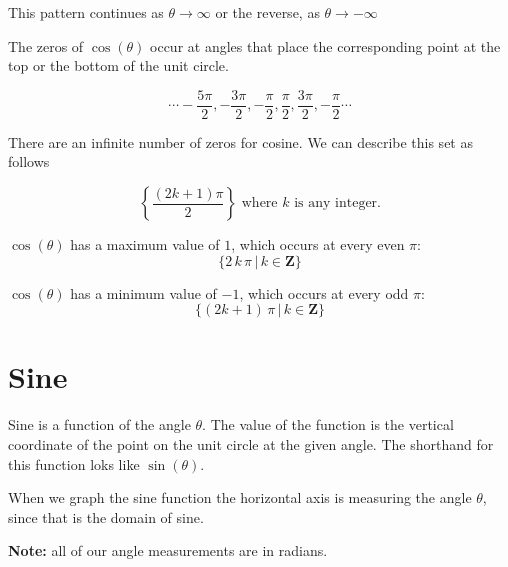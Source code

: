 \documentclass{ximera}
\begin{document}
This pattern continues as $\theta \rightarrow \infty$ or the reverse, as $\theta \rightarrow -\infty$

The zeros of $\cos(\theta)$ occur at angles that place the corresponding point at the top or the bottom of the unit circle.  


\[     \cdots -\frac{5\pi}{2},  -\frac{3\pi}{2},  -\frac{\pi}{2},  \frac{\pi}{2},  \frac{3\pi}{2},  -\frac{\pi}{2} \cdots \]


There are an infinite number of zeros for cosine.  We can describe this set as follows


\[  \left\{     \frac{(2k+1)\pi}{2}          \right\}    \text{ where }  k  \text{ is any integer.}     \]





$\cos(\theta)$ has a maximum value of $1$, which occurs at every even $\pi$:  
\[ \{  2 \, k \, \pi \, | \, k \in \textbf{Z}\} \]



$\cos(\theta)$ has a minimum value of $-1$, which occurs at every odd $\pi$:  
\[ \{  (2k+1) \, \pi \, | \, k \in \textbf{Z}\} \]











\section{Sine}

Sine is a function of the angle $\theta$. The value of the function is the vertical coordinate of the point on the unit circle at the given angle. The shorthand for this function loks like $\sin(\theta)$. 



When we graph the sine function the horizontal axis is measuring the angle $\theta$, since that is the domain of sine.

\textbf{Note:}  all of our angle measurements are in radians.
\end{document}
